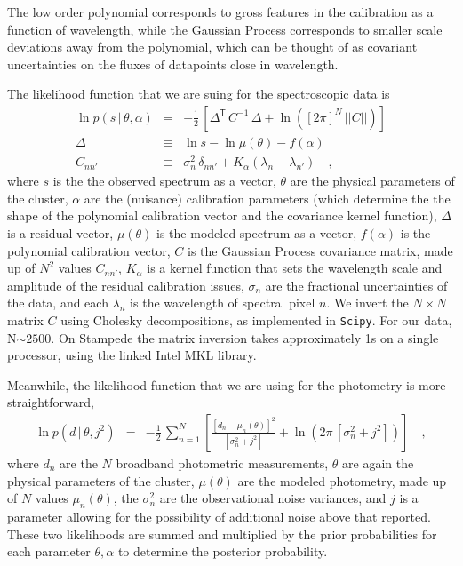 \documentclass[11pt,preprint]{aastex}
\newcommand{\transpose}[1]{{#1}^{\!\mathsf T}}
\newcommand{\given}{\,|\,}
\renewcommand{\det}[1]{||{#1}||}
\begin{document}
The low order polynomial corresponds to gross features in the calibration as a function of wavelength, while the Gaussian Process corresponds to smaller scale deviations away from the polynomial, which can be thought of as covariant uncertainties on the fluxes of datapoints close in wavelength.

The likelihood function that we are suing for the spectroscopic data is 
\begin{eqnarray}\label{eq:spectroscopicLF}
\ln p(s\given\theta,\alpha) &=& -\frac{1}{2}\,\left[\transpose{\Delta}\,C^{-1}\,\Delta + \ln([2\pi]^N\,\det{C}) \right]
\\
\Delta &\equiv& \ln s - \ln \mu(\theta) - f(\alpha) 
\\
C_{nn'} &\equiv& \sigma_n^2 \,\delta_{nn'} +
K_\alpha(\lambda_n - \lambda_{n'})
\quad ,
\end{eqnarray}
where $s$ is the the observed spectrum as a vector,
$\theta$ are the physical parameters of the cluster,
$\alpha$ are the (nuisance) calibration parameters
(which determine the the shape of the polynomial calibration vector and the covariance kernel function),
$\Delta$ is a residual vector,
$\mu(\theta)$ is the modeled spectrum as a vector,
$f(\alpha)$ is the polynomial calibration vector,
$C$ is the Gaussian Process covariance matrix,
made up of $N^2$ values $C_{nn'}$,
$K_\alpha$ is a kernel function that sets the wavelength scale and
amplitude of the residual calibration issues,
$\sigma_n$ are the fractional uncertainties of the data,
and each $\lambda_n$ is the wavelength of spectral pixel $n$.
We invert the $N \times N$ matrix $C$ using Cholesky decompositions, as implemented in \texttt{Scipy}. 
For our data, N$\sim 2500$.  
On Stampede the matrix inversion takes approximately 1s on a single processor, using the linked Intel MKL library.

Meanwhile, the likelihood function that we are using for the photometry is more straightforward, 
\begin{eqnarray}\label{eq:photometricLF}
\ln p(d\given\theta,j^2) &=& -\frac{1}{2}\,\sum_{n=1}^N \left[\frac{[d_n - \mu_n(\theta)]^2}{[\sigma_n^2 + j^2]} + \ln(2\pi\,[\sigma_n^2 + j^2]) \right]
\quad ,
\end{eqnarray}
where $d_n$ are the $N$ broadband photometric measurements,
$\theta$ are again the physical parameters of the cluster,
$\mu(\theta)$ are the modeled photometry,
made up of $N$ values $\mu_n(\theta)$,
the $\sigma_n^2$ are the observational noise variances,
and $j$ is a parameter allowing for the possibility of additional noise above that reported.
These two likelihoods are summed and multiplied by the prior probabilities for each parameter ${\theta, \alpha}$ to determine the posterior probability.
\end{document}

